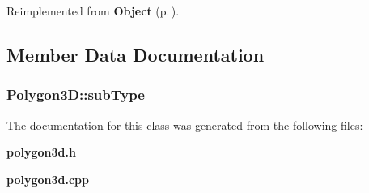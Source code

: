 Reimplemented from {\bf Object} {\rm (p.\,\pageref{classObject_a3})}.

\subsection{Member Data Documentation}
\subsubsection{ Polygon3D::sub\-Type\hspace{0.3cm}{\tt  [private]}}\label{classPolygon3D_o0}




The documentation for this class was generated from the following files:\begin{CompactItemize}
\item 
{\bf polygon3d.h}\item 
{\bf polygon3d.cpp}\end{CompactItemize}
